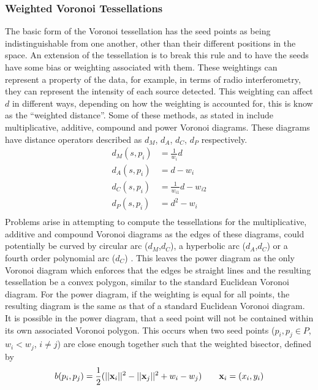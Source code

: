 \subsubsection{Weighted Voronoi Tessellations}\label{tes:ssec:wei}
The basic form of the Voronoi tessellation has the seed points as being indistinguishable from one another, other than their different positions in the space. An extension of the tessellation is to break this rule and to have the seeds have some bias or weighting associated with them. These weightings can represent a property of the data, for example, in terms of radio interferometry, they can represent the intensity of each source detected. This weighting can affect $d$ in different ways, depending on how the weighting is accounted for, this is know as the ``weighted distance''. Some of these methods, as stated in \citet{okabe2009spatial} include multiplicative, additive, compound and power Voronoi diagrams. These diagrams have distance operators described as $d_M$, $d_A$, $d_C$, $d_P$ respectively.
%
\begin{equation}
\begin{align}
  d_M(s,p_i) &= \frac{1}{w_i}d			\\
  d_A(s,p_i) &= d - w_i				\\
  d_C(s,p_i) &= \frac{1}{w_{i1}}d - w_{i2}	\\
  d_P(s,p_i) &= d^2 - w_i			\\
\end{align}
\end{equation}
%
Problems arise in attempting to compute the tessellations for the multiplicative, additive and compound Voronoi diagrams as the edges of these diagrams, could potentially be curved by circular arc ($d_M$,$d_C$), a hyperbolic arc ($d_A$,$d_C$) or a fourth order polynomial arc ($d_C$) \citep{okabe2009spatial}. This leaves the power diagram as the only Voronoi diagram which enforces that the edges be straight lines and the resulting tessellation be a convex polygon, similar to the standard Euclidean Voronoi diagram. For the power diagram, if the weighting is equal for all points, the resulting diagram is the same as that of a standard Euclidean Voronoi diagram. It is possible in the power diagram, that a seed point will not be contained within its own associated Voronoi polygon. This occurs when two seed points ($p_i,p_j \in P$, $w_i<w_j$, $i\neq j$) are close enough together such that the weighted bisector, defined by 
%
\begin{equation}
 b(p_i,p_j) = \frac{1}{2}(||\bold{x}_i||^2-||\bold{x}_j||^2+w_i-w_j) \qquad \bold{x}_i = (x_i,y_i)
\end{equation}
